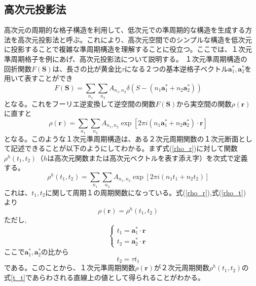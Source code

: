 \documentclass[11pt,a4j]{jreport}
\begin{document}
\subsection{高次元投影法}\label{高次元投影法}
高次元の周期的な格子構造を利用して、低次元での準周期的な構造を生成する方法を高次元投影法と呼ぶ。これにより、高次元空間でのシンプルな構造を低次元に投影することで複雑な準周期構造を理解することに役立つ。ここでは、１次元準周期格子を例にあげ、高次元投影法について説明する。
１次元準周期構造の回折関数$F(\bm S)$は、長さの比が黄金比$\tau$になる２つの基本逆格子ベクトル$\bm a_1^*,\bm a_2^*$を用いて表すことができ
\begin{equation}
  F(\bm S) = \sum_{n_1}\sum_{n_2}{A_{n_1,n_2}\delta(S-(n_1\bm a_1^*+n_2\bm a_2^*))}
  \label{F_S}
\end{equation}
となる。これをフーリエ逆変換して逆空間の関数$F(\bm S)$から実空間の関数$\rho(\bm r)$に直すと
\begin{equation}
  \rho(\bm r)=\sum_{n_1}\sum_{n_2}{A_{n_1,n_2}\exp[2\pi i(n_1\bm a_1^*+n_2\bm a_2^*)\cdot\bm r]}
  \label{rho_r}
\end{equation}
となる。このような１次元準周期構造は、ある２次元周期関数の１次元断面として記述できることが以下のようにしてわかる。まず式(\ref{rho_r})に対して関数$\rho^h(t_1,t_2)$（$h$は高次元関数または高次元ベクトルを表す添え字）を次式で定義する。
\begin{equation}
  \rho^h(t_1,t_2)=\sum_{n_1}\sum_{n_2}{A_{n_1,n_2}\exp[2\pi i(n_1t_1+n_2t_2)]}
  \label{rho_t}
\end{equation}
これは、$t_1,t_2$に関して周期１の周期関数になっている。式(\ref{rho_r}),式(\ref{rho_t})より
\begin{equation}
  \rho(\bm r)=\rho^h(t_1,t_2)
  \label{rho_r_t}
\end{equation}
ただし,
\begin{equation}
  \left\{
    \begin{aligned}
      t_1 = \bm a_1^*\cdot\bm r \\
      t_2 = \bm a_2^*\cdot\bm r
    \end{aligned}
 \right.
\end{equation}
ここで$\bm a_1^*,\bm a_2^*$の比から
\begin{equation}
  t_2=\tau t_1
  \label{t_t}
\end{equation}
である。このことから、１次元準周期関数$\rho(\bm r)$が２次元周期関数$\rho^h(t_1,t_2)$の式\ref{t_t}であらわされる直線上の値として得られることがわかる。\par
\end{document}
